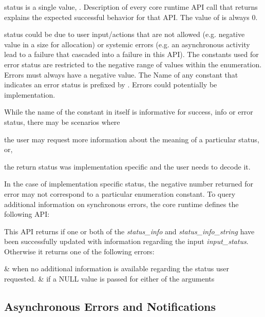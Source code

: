  status is a single value,
. Description of every core runtime
API call that returns  explains the
expected successful behavior for that API. The value of
 is always 0.

 status could be due to user input/actions that are not
allowed (e.g. negative value in a size for allocation) or systemic
errors (e.g. an asynchronous activity lead to a failure that
cascaded into a failure in this API). The constants used for error
status are restricted to the negative range of values within the
 enumeration. Errors must always have a
negative value. The Name of any constant that indicates an error status is
prefixed by . Errors could potentially be
implementation.

While the name of the constant in itself is informative for success,
info or error status, there may be scenarios where
\begin{inparaenum}[(i)] \item the user may request more information
about the meaning of a particular status, or, \item the return
status was implementation specific and the user needs to decode it.
\end{inparaenum} In the case of implementation specific status, the
negative number returned for error may not correspond to a
particular enumeration constant. To query additional
information on synchronous errors, the core runtime defines the
following API:



This API returns  if one or both of the
{\itshape status\_info} and {\itshape status\_info\_string} have been
successfully updated with information regarding the input
{\itshape input\_status}. Otherwise it returns one of the following errors:

\begin{easylist}
&  when no additional information is
available regarding the status user requested.
&  if a NULL value is
passed for either of the arguments
\end{easylist}

\begin{DIFnomarkup}
\hypertarget{asyncerror}{}\subsection{Asynchronous Errors and
Notifications}\label{asyncerror}
\end{DIFnomarkup}

